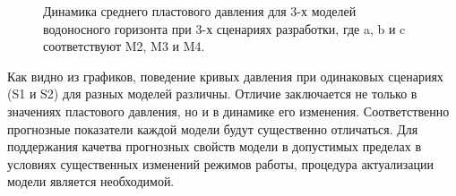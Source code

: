 \documentclass{article}
\begin{document}
\begin{figure}
{\begin{minipage}[h]{0.32\linewidth}
    \end{minipage} 
    \caption{Динамика среднего пластового давления для 3-х моделей водоносного горизонта при 3-х сценариях разработки, где a, b и c соответствуют M2, M3 и M4.}
    \label{fig:2din}
    }
\end{figure}
Как видно из графиков, поведение кривых давления при одинаковых сценариях (S1 и S2) для разных моделей различны. Отличие заключается не только в значениях пластового давления, но и в динамике его изменения. Соответственно прогнозные показатели каждой модели будут существенно отличаться. Для поддержания качетва прогнозных свойств модели в допустимых пределах в условиях существенных изменений режимов работы, процедура актуализации модели является необходимой.
\end{document}
